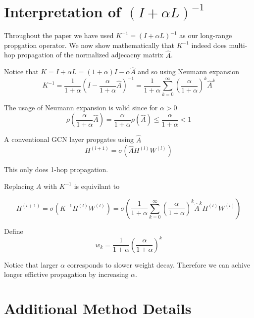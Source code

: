 \appendix

\section{Interpretation of $(I + \alpha L)^{-1}$}\label{sec:operator_interpretation}
Throughout the paper we have used $K^{-1} = (I + \alpha L)^{-1}$ as our
long-range propgation operator. We now show mathematically that $K^{-1}$ indeed
does multi-hop propagation of the normalized adjecacny matrix $\hat A$.

Notice that $K = I + \alpha L = (1 + \alpha)I - \alpha \hat A$ and so using Neumann expansion
\begin{equation}
    K^{-1} = \frac{1}{1 + \alpha}\left(I - \frac{\alpha}{1 + \alpha} \hat A \right)^{-1}=  \frac{1}{1 + \alpha}\sum_{k = 0}^{\infty}\left(\frac{\alpha}{1 + \alpha}\right)^{k} \hat A^k
\end{equation}

The usage of Neumann expansion is valid since for $\alpha > 0$
\begin{equation}
    \rho\left(\frac{\alpha}{1 + \alpha} \hat A \right) = \frac{\alpha}{1 + \alpha} \rho\left( \hat A \right) \leq  \frac{\alpha}{1 + \alpha} < 1
\end{equation}

A conventional GCN layer propgates using $\hat A$
\begin{equation*}
    H^{(l + 1)} = \sigma(\hat A H^{(l)} W^{(l)})
\end{equation*}

This only does 1-hop propagation.

Replacing $\hat A$ with $K^{-1}$ is equivilant to

\begin{equation*}
    H^{(l + 1)} = \sigma(K^{-1} H^{(l)} W^{(l)}) = \sigma\left(\frac{1}{1 + \alpha}\sum_{k = 0}^{\infty}\left(\frac{\alpha}{1 + \alpha}\right)^{k} \hat A^k H^{(l)} W^{(l)}\right)
\end{equation*}

Define
\begin{equation}
    w_k = \frac{1}{1 + \alpha} \left( \frac{\alpha}{1 + \alpha}\right )^k
\end{equation}

Notice that larger $\alpha$ corresponds to slower weight decay. Therefore we can
achive longer effictive propagation by increasing $\alpha$.

\section{Additional Method Details}
